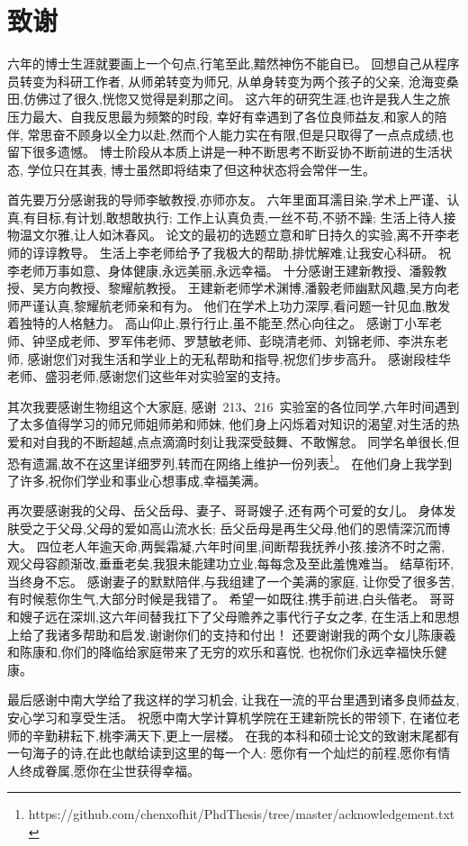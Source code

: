 \section{致谢} %

六年的博士生涯就要画上一个句点,行笔至此,黯然神伤不能自已。
回想自己从程序员转变为科研工作者,
从师弟转变为师兄,
从单身转变为两个孩子的父亲,
沧海变桑田,仿佛过了很久,恍惚又觉得是刹那之间。
这六年的研究生涯,也许是我人生之旅压力最大、自我反思最为频繁的时段,
幸好有幸遇到了各位良师益友,和家人的陪伴,
常思奋不顾身以全力以赴,然而个人能力实在有限,但是只取得了一点点成绩,也留下很多遗憾。
博士阶段从本质上讲是一种不断思考不断妥协不断前进的生活状态,
学位只在其表,
博士虽然即将结束了但这种状态将会常伴一生。

首先要万分感谢我的导师李敏教授,亦师亦友。
六年里面耳濡目染,学术上严谨、认真,有目标,有计划,敢想敢执行;
工作上认真负责,一丝不苟,不骄不躁;
生活上待人接物温文尔雅,让人如沐春风。
论文的最初的选题立意和旷日持久的实验,离不开李老师的谆谆教导。
生活上李老师给予了我极大的帮助,排忧解难,让我安心科研。
祝李老师万事如意、身体健康,永远美丽,永远幸福。
十分感谢王建新教授、潘毅教授、吴方向教授、黎耀航教授。
王建新老师学术渊博,潘毅老师幽默风趣,吴方向老师严谨认真,黎耀航老师亲和有为。
他们在学术上功力深厚,看问题一针见血,散发着独特的人格魅力。
高山仰止,景行行止,虽不能至,然心向往之。
感谢丁小军老师、钟坚成老师、罗军伟老师、罗慧敏老师、彭晓清老师、刘锦老师、李洪东老师,
感谢您们对我生活和学业上的无私帮助和指导,祝您们步步高升。
感谢段桂华老师、盛羽老师,感谢您们这些年对实验室的支持。

其次我要感谢生物组这个大家庭,
感谢~213、216~实验室的各位同学,六年时间遇到了太多值得学习的师兄师姐师弟和师妹,
他们身上闪烁着对知识的渴望,对生活的热爱和对自我的不断超越,点点滴滴时刻让我深受鼓舞、不敢懈怠。
同学名单很长,但恐有遗漏,故不在这里详细罗列,转而在网络上维护一份列表\footnote{https://github.com/chenxofhit/PhdThesis/tree/master/acknowledgement.txt}。
在他们身上我学到了许多,祝你们学业和事业心想事成,幸福美满。

再次要感谢我的父母、岳父岳母、妻子、哥哥嫂子,还有两个可爱的女儿。
身体发肤受之于父母,父母的爱如高山流水长;
岳父岳母是再生父母,他们的恩情深沉而博大。
四位老人年逾天命,两鬓霜凝,六年时间里,间断帮我抚养小孩,接济不时之需,
观父母容颜渐改,垂垂老矣,我狠未能建功立业,每每念及至此羞愧难当。
结草衔环,当终身不忘。
感谢妻子的默默陪伴,与我组建了一个美满的家庭,
让你受了很多苦,有时候惹你生气,大部分时候是我错了。
希望一如既往,携手前进,白头偕老。
哥哥和嫂子远在深圳,这六年间替我扛下了父母赡养之事代行子女之孝,
在生活上和思想上给了我诸多帮助和启发,谢谢你们的支持和付出！
还要谢谢我的两个女儿陈康羲和陈康和,你们的降临给家庭带来了无穷的欢乐和喜悦,
也祝你们永远幸福快乐健康。

最后感谢中南大学给了我这样的学习机会, 
让我在一流的平台里遇到诸多良师益友,
安心学习和享受生活。
祝愿中南大学计算机学院在王建新院长的带领下, 
在诸位老师的辛勤耕耘下,桃李满天下,更上一层楼。
在我的本科和硕士论文的致谢末尾都有一句海子的诗,在此也献给读到这里的每一个人:
愿你有一个灿烂的前程,愿你有情人终成眷属,愿你在尘世获得幸福。